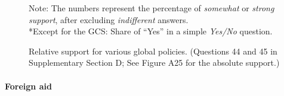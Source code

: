 \begin{figure}[h!]
  \caption[Relative support for further global policies]{Relative support for various global policies. %
  (Questions 44 and 45 in Supplementary Section D; See Figure A25 for the absolute support.)%
  }
  \label{fig:support}
  {\footnotesize Note: The numbers represent the percentage of \textit{somewhat} or \textit{strong support}, after excluding \textit{indifferent} answers. \\
  *Except for the GCS: Share of ``Yes'' in a simple \textit{Yes/No} question. } 
\end{figure} 


\paragraph{Foreign aid}\label{subsubsec:support_foreign_aid} %

